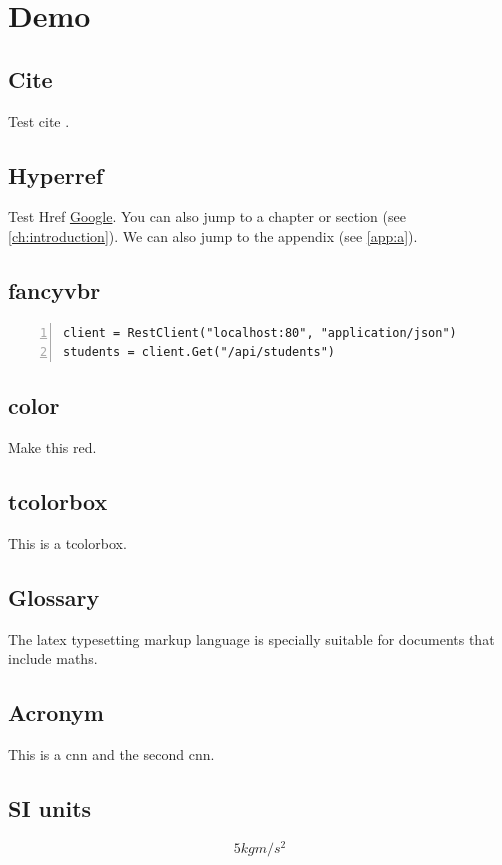 \chapter*{Demo}
\section*{Cite}
Test cite .

\section*{Hyperref}
Test Href \href{http://google.ch}{Google}. You can also jump to a chapter or section (see \ref{ch:introduction}). We can also jump to the appendix (see \ref{app:a}).

\section*{fancyvbr}

\begin{Verbatim}[numbers=left, frame=single]
client = RestClient("localhost:80", "application/json")
students = client.Get("/api/students")
\end{Verbatim}

\section*{color}
Make {\color{red} this} red.

\section*{tcolorbox}
\begin{tcolorbox}
This is a tcolorbox.
\end{tcolorbox}

\section*{Glossary}
The \gls{latex} typesetting markup language is specially suitable 
for documents that include \gls{maths}. 

\section*{Acronym}
This is a \gls{cnn} and the second \gls{cnn}.

\section*{SI units}
\[5 kg m /s^2\]

